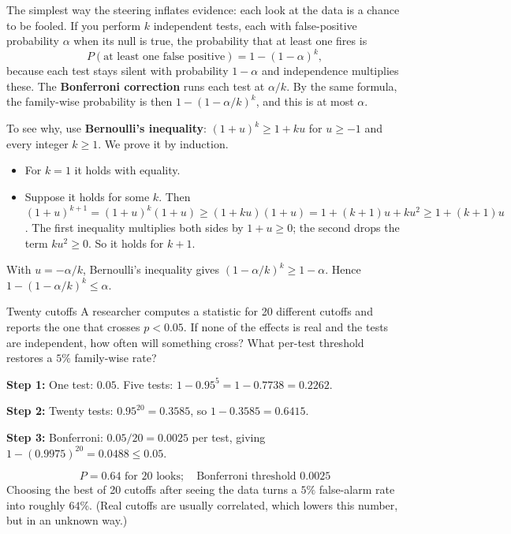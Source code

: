 The simplest way the steering inflates evidence: each look at the data is a chance to be fooled. If you perform $k$ independent tests, each with false-positive probability $\alpha$ when its null is true, the probability that at least one fires is
\begin{equation}
P(\text{at least one false positive})=1-(1-\alpha)^k,
\label{eq:controls-fwer}
\end{equation}
because each test stays silent with probability $1-\alpha$ and independence multiplies these. The \textbf{Bonferroni correction} runs each test at $\alpha/k$. By the same formula, the family-wise probability is then $1-(1-\alpha/k)^k$, and this is at most $\alpha$.

To see why, use \textbf{Bernoulli's inequality}: $(1+u)^k\ge1+ku$ for $u\ge-1$ and every integer $k\ge1$. We prove it by induction.
\begin{itemize}
\item For $k=1$ it holds with equality.
\item Suppose it holds for some $k$. Then $(1+u)^{k+1}=(1+u)^k(1+u)\ge(1+ku)(1+u)=1+(k+1)u+ku^2\ge1+(k+1)u$. The first inequality multiplies both sides by $1+u\ge0$; the second drops the term $ku^2\ge0$. So it holds for $k+1$.
\end{itemize}
With $u=-\alpha/k$, Bernoulli's inequality gives $(1-\alpha/k)^k\ge1-\alpha$. Hence $1-(1-\alpha/k)^k\le\alpha$.

\begin{sample}{Twenty cutoffs}
A researcher computes a statistic for 20 different cutoffs and reports the one that crosses $p<0.05$. If none of the effects is real and the tests are independent, how often will something cross? What per-test threshold restores a $5\%$ family-wise rate?

\textbf{Step 1:} One test: $0.05$. Five tests: $1-0.95^5=1-0.7738=0.2262$.

\textbf{Step 2:} Twenty tests: $0.95^{20}=0.3585$, so $1-0.3585=0.6415$.

\textbf{Step 3:} Bonferroni: $0.05/20=0.0025$ per test, giving $1-(0.9975)^{20}=0.0488\le0.05$.

\[
\boxed{P=0.64\text{ for 20 looks};\quad\text{Bonferroni threshold }0.0025}
\]
Choosing the best of 20 cutoffs after seeing the data turns a $5\%$ false-alarm rate into roughly $64\%$. (Real cutoffs are usually correlated, which lowers this number, but in an unknown way.)
\end{sample}

